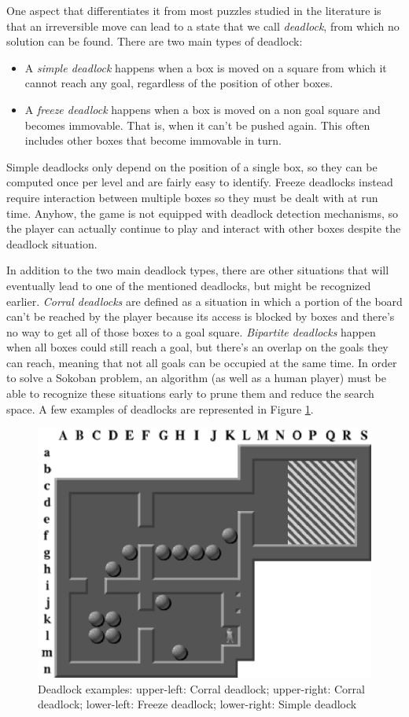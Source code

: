 \medskip\noindent
One aspect that differentiates it from most puzzles studied in the literature is that an irreversible move can lead to a state that we call \textit{deadlock}, from which no solution can be found. There are two main types of deadlock:
\begin{itemize}
    \item A \textit{simple deadlock} happens when a box is moved on a square from which it cannot reach any goal, regardless of the position of other boxes.
    \item A \textit{freeze deadlock} happens when a box is moved on a non goal square and becomes immovable. That is, when it can't be pushed again. This often includes other boxes that become immovable in turn.
\end{itemize}
Simple deadlocks only depend on the position of a single box, so they can be computed once per level and are fairly easy to identify. Freeze deadlocks instead require interaction between multiple boxes so they must be dealt with at run time. Anyhow, the game is not equipped with deadlock detection mechanisms, so the player can actually continue to play and interact with other boxes despite the deadlock situation. 

\medskip\noindent
In addition to the two main deadlock types, there are other situations that will eventually lead to one of the mentioned deadlocks, but might be recognized earlier. \textit{Corral deadlocks} are defined as a situation in which a portion of the board can't be reached by the player because its access is blocked by boxes and there's no way to get all of those boxes to a goal square. \textit{Bipartite deadlocks} happen when all boxes could still reach a goal, but there's an overlap on the goals they can reach, meaning that not all goals can be occupied at the same time. In order to solve a Sokoban problem, an algorithm (as well as a human player) must be able to recognize these situations early to prune them and reduce the search space. A few examples of deadlocks are represented in Figure \ref{fig:deadlock}.
\begin{figure}[!h]
\centering
\includegraphics[width=0.7\linewidth]{pictures/sokoban_deadlock.png}
\caption[Deadlock example]{Deadlock examples: upper-left: Corral deadlock; upper-right: Corral deadlock; lower-left: Freeze deadlock; lower-right: Simple deadlock \cite{Junghanns99pushingthe}}
\label{fig:deadlock}
\end{figure}

